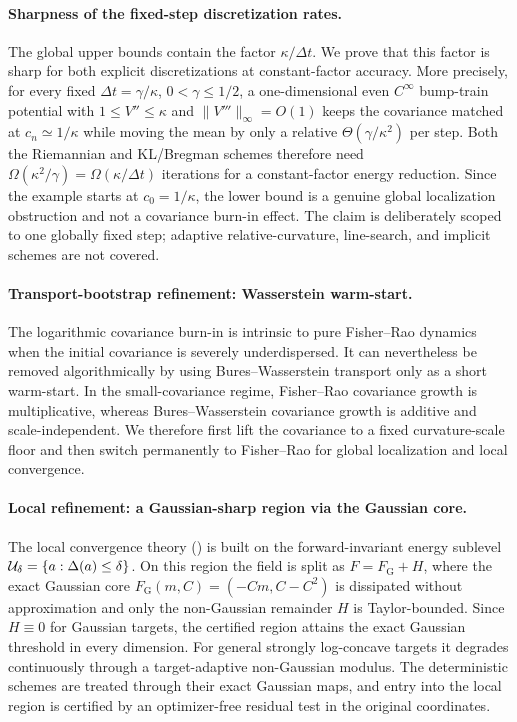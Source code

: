 \paragraph{Sharpness of the fixed-step discretization rates.}
The global upper bounds contain the factor $\kappa/\Delta t$.  We prove that this factor is sharp
for both explicit discretizations at constant-factor accuracy.  More precisely, for every fixed
$\Delta t=\gamma/\kappa$, $0<\gamma\leq1/2$, a one-dimensional even $C^\infty$ bump-train
potential with $1\leq V''\leq\kappa$ and $\|V'''\|_\infty=O(1)$ keeps the covariance matched at
$c_n\simeq1/\kappa$ while moving the mean by only a relative
$\Theta(\gamma/\kappa^2)$ per step.  Both the Riemannian and KL/Bregman schemes therefore need
$\Omega(\kappa^2/\gamma)=\Omega(\kappa/\Delta t)$ iterations for a constant-factor energy
reduction.  Since the example starts at $c_0=1/\kappa$, the lower bound is a genuine global
localization obstruction and not a covariance burn-in effect.  The claim is deliberately scoped
to one globally fixed step; adaptive relative-curvature, line-search, and implicit schemes are not
covered.

\paragraph{Transport-bootstrap refinement: Wasserstein warm-start.}
The logarithmic covariance burn-in is intrinsic to pure Fisher--Rao dynamics when the initial
covariance is severely underdispersed.  It can nevertheless be removed algorithmically by using
Bures--Wasserstein transport only as a short warm-start.  In the small-covariance regime,
Fisher--Rao covariance growth is multiplicative, whereas Bures--Wasserstein covariance growth is
additive and scale-independent.  We therefore first lift the covariance to a fixed curvature-scale
floor and then switch permanently to Fisher--Rao for global localization and local convergence.

\paragraph{Local refinement: a Gaussian-sharp region via the Gaussian core.}
The local convergence theory () is built on the forward-invariant energy sublevel
$\mathcal{U}_\delta=\{a:\Delta(a)\leq\delta\}$.  On this region the field is split as
$F=F_{\mathrm G}+H$, where the exact Gaussian core
$F_{\mathrm G}(m,C)=(-Cm,C-C^2)$ is dissipated without approximation and only the
non-Gaussian remainder $H$ is Taylor-bounded.  Since $H\equiv0$ for Gaussian targets, the
certified region attains the exact Gaussian threshold in every dimension.  For general strongly
log-concave targets it degrades continuously through a target-adaptive non-Gaussian modulus.
The deterministic schemes are treated through their exact Gaussian maps, and entry into the local
region is certified by an optimizer-free residual test in the original coordinates.

